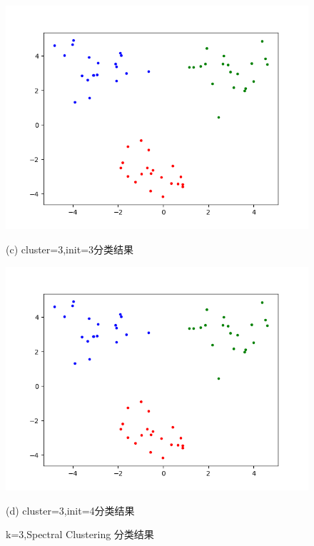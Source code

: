 \documentclass{article}
\begin{document}
\begin{figure}[htbp]
 	\begin{minipage}{0.48\linewidth}
 		\centerline{\includegraphics[width=0.7\linewidth]{img//sc1.png}}
 		\centerline{(c)  cluster=3,init=3分类结果}
 	\end{minipage}
 	\begin{minipage}{0.48\linewidth}
 		\centerline{\includegraphics[width=0.7\linewidth]{img//sc1.png}}
 		\centerline{(d) cluster=3,init=4分类结果}
 	\end{minipage}
 	\caption{k=3,Spectral Clustering 分类结果}
 \end{figure}
 
 
\end{document}
